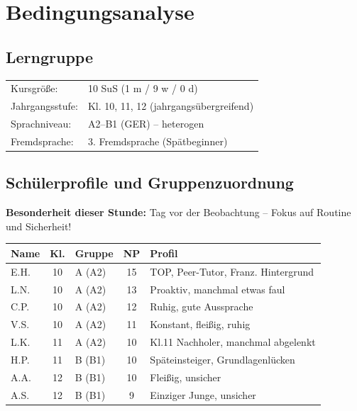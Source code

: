\documentclass[11pt,a4paper]{article}
\newcommand{\lerngruppengroesse}{10}
\newcommand{\maennlich}{1}
\newcommand{\weiblich}{9}
\newcommand{\divers}{0}
\newcommand{\gerniveau}{A2--B1}
\begin{document}
\tableofcontents
\newpage

\section{Bedingungsanalyse}

\subsection{Lerngruppe}
\begin{tabular}{ll}
    Kursgröße: & \lerngruppengroesse{} SuS (\maennlich{} m / \weiblich{} w / \divers{} d) \\
    Jahrgangsstufe: & Kl. 10, 11, 12 (jahrgangsübergreifend) \\
    Sprachniveau: & \gerniveau{} (GER) -- heterogen \\
    Fremdsprache: & 3. Fremdsprache (Spätbeginner) \\
\end{tabular}

\subsection{Schülerprofile und Gruppenzuordnung}

\textbf{Besonderheit dieser Stunde:} Tag vor der Beobachtung -- Fokus auf Routine und Sicherheit!

\vspace{0.5em}

\begin{tabular}{|l|c|l|c|p{4.5cm}|}
\hline
\textbf{Name} & \textbf{Kl.} & \textbf{Gruppe} & \textbf{NP} & \textbf{Profil} \\
\hline
\textcolor{gruppeA}{E.H.} & 10 & \textcolor{gruppeA}{A (A2)} & 15 & TOP, Peer-Tutor, Franz. Hintergrund \\
\hline
\textcolor{gruppeA}{L.N.} & 10 & \textcolor{gruppeA}{A (A2)} & 13 & Proaktiv, manchmal etwas faul \\
\hline
\textcolor{gruppeA}{C.P.} & 10 & \textcolor{gruppeA}{A (A2)} & 12 & Ruhig, gute Aussprache \\
\hline
\textcolor{gruppeA}{V.S.} & 10 & \textcolor{gruppeA}{A (A2)} & 11 & Konstant, fleißig, ruhig \\
\hline
\textcolor{gruppeA}{L.K.} & 11 & \textcolor{gruppeA}{A (A2)} & 10 & Kl.11 Nachholer, manchmal abgelenkt \\
\hline
\textcolor{gruppeB}{H.P.} & 11 & \textcolor{gruppeB}{B (B1)} & 10 & Späteinsteiger, Grundlagenlücken \\
\hline
\textcolor{gruppeB}{A.A.} & 12 & \textcolor{gruppeB}{B (B1)} & 10 & Fleißig, unsicher \\
\hline
\textcolor{gruppeB}{A.S.} & 12 & \textcolor{gruppeB}{B (B1)} & 9 & Einziger Junge, unsicher \\
\hline
\end{tabular}
\end{document}

